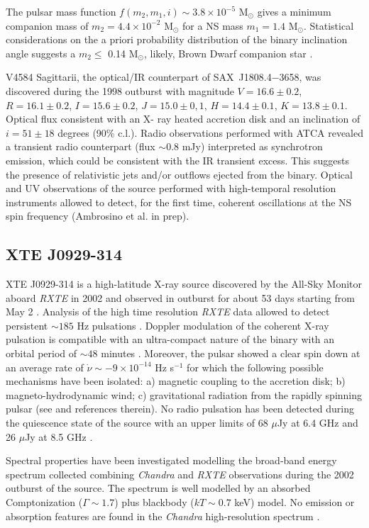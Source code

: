 \documentclass[graybox]{svmult}
\def \chandra {{\em Chandra\xspace}}
\def \rxte {{\em RXTE\xspace}}
\def \saxj{{\rm SAX~J1808.4$-$3658\xspace}}
\begin{document}
The pulsar mass function $f(m_2,m_1,i)\sim 3.8\times 10^{-5}$ M$_\odot$ gives a minimum companion mass of $m_2=4.4\times10^{-2}$ M$_\odot$ for a NS mass $m_1=1.4$ M$_\odot$. Statistical considerations on the a priori probability distribution of the binary inclination angle suggests a $m_2\leq$ 0.14 M$_\odot$, likely, Brown Dwarf companion star \cite{Bildsten2001,Deloye2008,DiSalvo2008}.

V4584 Sagittarii, the optical/IR counterpart of \saxj{}, was discovered during the 1998 outburst with magnitude $V=16.6\pm0.2$, $R=16.1\pm0.2$, $I=15.6\pm0.2$, $J=15.0\pm0,1$, $H=14.4\pm0.1$, $K=13.8\pm0.1$. Optical flux consistent with an X-
ray heated accretion disk and an inclination of $i=51\pm18$ degrees (90\% c.l.)\cite{Wang2001}. Radio observations performed with ATCA revealed a transient radio counterpart (flux $\sim$0.8 mJy) interpreted as synchrotron emission, which could be consistent with the IR transient excess. This suggests the presence of relativistic jets and/or outflows ejected from the binary. 
Optical and UV observations of the source performed with high-temporal resolution instruments allowed to detect, for the first time, coherent oscillations at the NS spin frequency (Ambrosino et al. in prep).


\subsection{XTE J0929-314}

XTE J0929-314 is a high-latitude X-ray source discovered by the All-Sky Monitor aboard \rxte{} in 2002 and observed in outburst for about 53 days starting from May 2 \cite{Galloway2002a}. Analysis of the high time resolution \rxte{} data allowed to detect persistent $\sim185$ Hz pulsations \cite{Remillard2002}. Doppler modulation of the coherent X-ray pulsation is compatible with an ultra-compact nature of the binary with an orbital period of $\sim48$ minutes \cite{Galloway2002}. Moreover, the pulsar showed a clear spin down at an average rate of $\dot{\nu}\sim-9\times 10^{-14}$ Hz s$^{-1}$ for which the following possible mechanisms have been isolated: a) magnetic coupling to the accretion disk; b) magneto-hydrodynamic wind; c) gravitational radiation from the rapidly spinning pulsar (see \cite{Galloway2002} and references therein). No radio pulsation has been detected during the quiescence state of the source with an upper limits of 68 $\mu$Jy at 6.4 GHz and 26 $\mu$Jy at 8.5 GHz \cite{Iacolina2009}.

Spectral properties have been investigated modelling the broad-band energy spectrum collected combining \chandra{} and \rxte{} observations during the 2002 outburst of the source. The spectrum is well modelled by an absorbed Comptonization ($\Gamma\sim1.7$) plus blackbody ($kT\sim 0.7$ keV) model. No emission or absorption features are found in the \chandra{} high-resolution spectrum \cite{Juett2003}.
\end{document}
